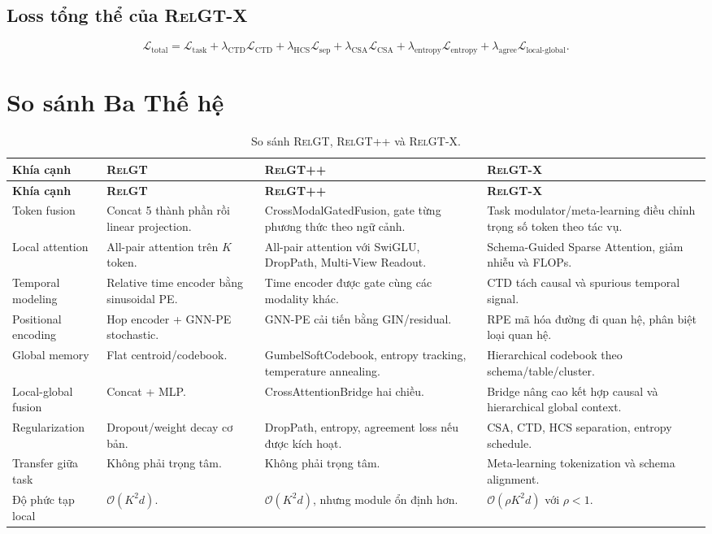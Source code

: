 \documentclass[12pt,a4paper]{article}
\newcommand{\RelGT}{\textsc{RelGT}}
\newcommand{\RelGTpp}{\textsc{RelGT++}}
\newcommand{\RelGTx}{\textsc{RelGT-X}}
\begin{document}
\subsection{Loss tổng thể của \RelGTx{}}

\[
  \boxed{
  \mathcal{L}_\text{total}=
  \mathcal{L}_\text{task}
  +\lambda_\text{CTD}\mathcal{L}_\text{CTD}
  +\lambda_\text{HCS}\mathcal{L}_\text{sep}
  +\lambda_\text{CSA}\mathcal{L}_\text{CSA}
  +\lambda_\text{entropy}\mathcal{L}_\text{entropy}
  +\lambda_\text{agree}\mathcal{L}_\text{local-global}
  }.
\]

\section{So sánh Ba Thế hệ}

\begin{longtable}{p{3.2cm}p{3.7cm}p{3.7cm}p{3.7cm}}
\caption{So sánh \RelGT{}, \RelGTpp{} và \RelGTx{}.}\\
\toprule
\textbf{Khía cạnh} & \textbf{\RelGT{}} & \textbf{\RelGTpp{}} & \textbf{\RelGTx{}} \\
\midrule
\endfirsthead
\toprule
\textbf{Khía cạnh} & \textbf{\RelGT{}} & \textbf{\RelGTpp{}} & \textbf{\RelGTx{}} \\
\midrule
\endhead
Token fusion &
Concat 5 thành phần rồi linear projection. &
CrossModalGatedFusion, gate từng phương thức theo ngữ cảnh. &
Task modulator/meta-learning điều chỉnh trọng số token theo tác vụ. \\
\midrule
Local attention &
All-pair attention trên $K$ token. &
All-pair attention với SwiGLU, DropPath, Multi-View Readout. &
Schema-Guided Sparse Attention, giảm nhiễu và FLOPs. \\
\midrule
Temporal modeling &
Relative time encoder bằng sinusoidal PE. &
Time encoder được gate cùng các modality khác. &
CTD tách causal và spurious temporal signal. \\
\midrule
Positional encoding &
Hop encoder + GNN-PE stochastic. &
GNN-PE cải tiến bằng GIN/residual. &
RPE mã hóa đường đi quan hệ, phân biệt loại quan hệ. \\
\midrule
Global memory &
Flat centroid/codebook. &
GumbelSoftCodebook, entropy tracking, temperature annealing. &
Hierarchical codebook theo schema/table/cluster. \\
\midrule
Local-global fusion &
Concat + MLP. &
CrossAttentionBridge hai chiều. &
Bridge nâng cao kết hợp causal và hierarchical global context. \\
\midrule
Regularization &
Dropout/weight decay cơ bản. &
DropPath, entropy, agreement loss nếu được kích hoạt. &
CSA, CTD, HCS separation, entropy schedule. \\
\midrule
Transfer giữa task &
Không phải trọng tâm. &
Không phải trọng tâm. &
Meta-learning tokenization và schema alignment. \\
\midrule
Độ phức tạp local &
$\mathcal{O}(K^2d)$. &
$\mathcal{O}(K^2d)$, nhưng module ổn định hơn. &
$\mathcal{O}(\rho K^2d)$ với $\rho<1$. \\
\bottomrule
\end{longtable}
\end{document}
